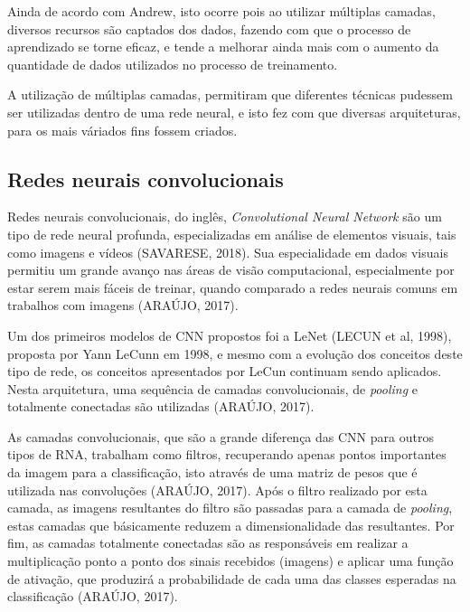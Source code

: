 
Ainda de acordo com Andrew, isto ocorre pois ao utilizar múltiplas camadas, diversos recursos são captados dos dados, fazendo com que o processo de aprendizado se torne eficaz, e tende a melhorar ainda mais com o aumento da quantidade de dados utilizados no processo de treinamento. 

A utilização de múltiplas camadas, permitiram que diferentes técnicas pudessem ser utilizadas dentro de uma rede neural, e isto fez com que diversas arquiteturas, para os mais váriados fins fossem criados.

\subsection{Redes neurais convolucionais}

Redes neurais convolucionais, do inglês, \textit{Convolutional Neural Network} são um tipo de rede neural profunda, especializadas em análise de elementos visuais, tais como imagens e vídeos (SAVARESE, 2018).  Sua especialidade em dados visuais permitiu um grande avanço nas áreas de visão computacional, especialmente por estar serem mais fáceis de treinar, quando comparado a redes neurais comuns em trabalhos com imagens (ARAÚJO, 2017).

Um dos primeiros modelos de CNN propostos foi a LeNet (LECUN et al, 1998), proposta por Yann LeCunn em 1998, e mesmo com a evolução dos conceitos deste tipo de rede, os conceitos apresentados por LeCun continuam sendo aplicados. Nesta arquitetura, uma sequência de camadas convolucionais, de \textit{pooling} e totalmente conectadas são utilizadas (ARAÚJO, 2017).

As camadas convolucionais, que são a grande diferença das CNN para outros tipos de RNA, trabalham como filtros, recuperando apenas pontos importantes da imagem para a classificação, isto através de uma matriz de pesos que é utilizada nas convoluções (ARAÚJO, 2017). Após o filtro realizado por esta camada, as imagens resultantes do filtro são passadas para a camada de \textit{pooling}, estas camadas que básicamente reduzem a dimensionalidade das resultantes. Por fim, as camadas totalmente conectadas são as responsáveis em realizar a multiplicação ponto a ponto dos sinais recebidos (imagens) e aplicar uma função de ativação, que produzirá a probabilidade de cada uma das classes esperadas na classificação (ARAÚJO, 2017).


